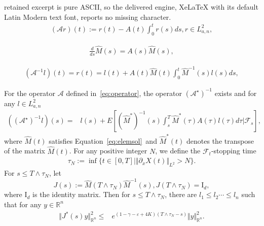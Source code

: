 \documentclass[10pt,a4paper]{amsart}
\begin{document}
retained excerpt is pure ASCII, so the delivered engine, XeLaTeX with its default Latin Modern text font, reports no missing character.
\begin{align}\label{eq:operator}
	(\mathcal{A} r)(t):=r(t)-A(t)\int_{0}^{t}r(s)ds, r\in L_{a,n}^{2},
\end{align}

	\begin{align}\label{eq:elemsol}
	\frac{d}{ds}\hat{M}(s)=A(s)\hat{M}(s),
\end{align}

\begin{align}\label{eq:opeinvers}
	(\mathcal{A}^{-1}l)(t)=r(t)=l(t)+A(t)\hat{M}(t)\int_{0}^{t}\hat{M}^{-1}(s)l(s)ds,
\end{align}

	\begin{lemma}\label{lem:opera}
		 For the operator $\mathcal{A}$ defined in~\eqref{eq:operator}, the operator $	(\mathcal{A}^{\star})^{-1}$ exists and for any $l\in L_{a,n}^{2}$	
		\begin{align}\label{eq:inveroperator}
			((\mathcal{A}^{\star})^{-1}l)(s)=&l(s)+E\left[(\hat{M}^{*})^{-1}(s)\int_{s}^{T}\hat{M}^{*}(\tau)A(\tau)l(\tau)d\tau|\mathcal{F}_{s}\right],
		\end{align}
		where $\hat{M}(t)$ satisfies Equation~\eqref{eq:elemsol}~and $\hat{M}^{*}(t)$ denotes the transpose of the matrix $\hat{M}(t)$. For any positive integer $N$, we define the $\mathcal{F}_{t}$-stopping time
		\begin{align*}
			\tau_{N}:=\inf\{t\in[0,T]\mid\Vert \partial_{x}X(t)\Vert_{L^{2}}> N \}.
		\end{align*}
		For $s\leq T\wedge\tau_{N}$, let 
		$$J(s):=\hat{M}(T\wedge\tau_{N})\hat{M}^{-1}(s),J(T\wedge\tau_{N})=\text{I}_{d},$$
		where $\text{I}_{d}$ is the identity matrix. Then for $s\leq T\wedge\tau_{N}$, there are  $l_{1}\leq l_{2}\cdots\leq l_{n}$ such that for any $y\in\mathbb{R}^{n}$
		\begin{align}\label{eq:opestimat}
			\Vert J^{*}(s)y\Vert^{2}_{\mathbb{R}^{n}}\leq&e^{(1-\gamma-\varepsilon+4K)(T\wedge\tau_{N}-s)}\Vert y\Vert^{2}_{\mathbb{R}^{n}}.
		\end{align}
	\end{lemma}
\end{document}
